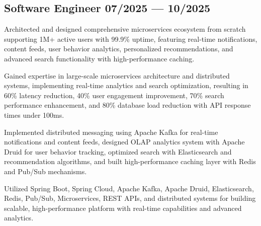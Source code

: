 \subsection{{Software Engineer \hfill 07/2025 --- 10/2025}}
\begin{zitemize}
    \item Architected and designed comprehensive microservices ecosystem from scratch supporting 1M+ active users with 99.9\% uptime, featuring real-time notifications, content feeds, user behavior analytics, personalized recommendations, and advanced search functionality with high-performance caching.
    \item Gained expertise in large-scale microservices architecture and distributed systems, implementing real-time analytics and search optimization, resulting in 60\% latency reduction, 40\% user engagement improvement, 70\% search performance enhancement, and 80\% database load reduction with API response times under 100ms.
    \item Implemented distributed messaging using Apache Kafka for real-time notifications and content feeds, designed OLAP analytics system with Apache Druid for user behavior tracking, optimized search with Elasticsearch and recommendation algorithms, and built high-performance caching layer with Redis and Pub/Sub mechanisms.
    \item Utilized Spring Boot, Spring Cloud, Apache Kafka, Apache Druid, Elasticsearch, Redis, Pub/Sub, Microservices, REST APIs, and distributed systems for building scalable, high-performance platform with real-time capabilities and advanced analytics.
\end{zitemize}

